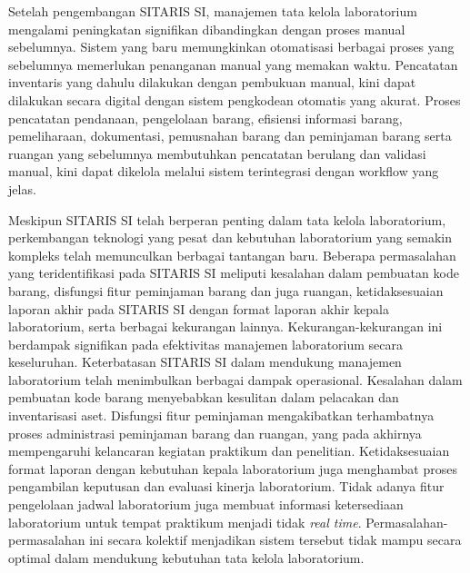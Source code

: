 Setelah pengembangan SITARIS SI, manajemen tata kelola laboratorium mengalami peningkatan signifikan dibandingkan dengan proses manual sebelumnya. Sistem yang baru memungkinkan otomatisasi berbagai proses yang sebelumnya memerlukan penanganan manual yang memakan waktu. Pencatatan inventaris yang dahulu dilakukan dengan pembukuan manual, kini dapat dilakukan secara digital dengan sistem pengkodean otomatis yang akurat. Proses pencatatan pendanaan, pengelolaan barang, efisiensi informasi barang, pemeliharaan, dokumentasi, pemusnahan barang dan peminjaman barang serta ruangan yang sebelumnya membutuhkan pencatatan berulang dan validasi manual, kini dapat dikelola melalui sistem terintegrasi dengan workflow yang jelas.

Meskipun SITARIS SI telah berperan penting dalam tata kelola laboratorium, perkembangan teknologi yang pesat dan kebutuhan laboratorium yang semakin kompleks telah memunculkan berbagai tantangan baru. Beberapa permasalahan yang teridentifikasi pada SITARIS SI meliputi kesalahan dalam pembuatan kode barang, disfungsi fitur peminjaman barang dan juga ruangan, ketidaksesuaian laporan akhir pada SITARIS SI dengan format laporan akhir kepala laboratorium, serta berbagai kekurangan lainnya. Kekurangan-kekurangan ini berdampak signifikan pada efektivitas manajemen laboratorium secara keseluruhan. Keterbatasan SITARIS SI dalam mendukung manajemen laboratorium telah menimbulkan berbagai dampak operasional. Kesalahan dalam pembuatan kode barang menyebabkan kesulitan dalam pelacakan dan inventarisasi aset. Disfungsi fitur peminjaman mengakibatkan terhambatnya proses administrasi peminjaman barang dan ruangan, yang pada akhirnya mempengaruhi kelancaran kegiatan praktikum dan penelitian. Ketidaksesuaian format laporan dengan kebutuhan kepala laboratorium juga menghambat proses pengambilan keputusan dan evaluasi kinerja laboratorium. Tidak adanya fitur pengelolaan jadwal laboratorium juga membuat informasi ketersediaan laboratorium untuk tempat praktikum menjadi tidak \textit{real time}. Permasalahan-permasalahan ini secara kolektif menjadikan sistem tersebut tidak mampu secara optimal dalam mendukung kebutuhan tata kelola laboratorium.

